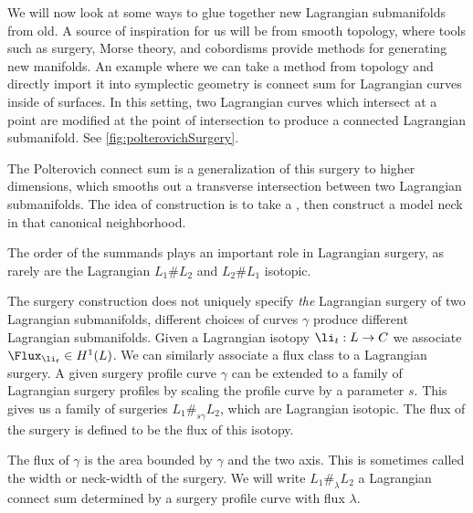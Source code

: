 
We will now look at some ways to glue together new Lagrangian submanifolds from old.
A source of inspiration for us will be from smooth topology, where tools such as surgery, Morse theory, and cobordisms provide methods for generating new manifolds.
An example where we can take a method from topology and directly import it into symplectic geometry is connect sum for Lagrangian curves inside of surfaces.
In this setting, two Lagrangian curves which intersect at a point are modified at the point of intersection to produce a connected Lagrangian submanifold.
See \cref{fig:polterovichSurgery}.

The Polterovich connect sum is a generalization of this surgery to higher dimensions, which smooths out a transverse intersection between two Lagrangian submanifolds. 
The idea of construction is to take a  , then construct a model neck in that canonical neighborhood. 



The order of the summands plays an important role in Lagrangian surgery, as rarely are the Lagrangian $L_1\#L_2$ and $L_2\#L_1$ isotopic. 

The surgery construction does not uniquely specify \emph{the} Lagrangian surgery of two Lagrangian submanifolds,  different choices of curves $\gamma$ produce different Lagrangian submanifolds.
Given a Lagrangian isotopy $\li_t: L\to C$ we associate  $\Flux_{\li_t}\in H^1(L)$. 
We can similarly associate a flux class to a Lagrangian surgery.
A given surgery profile curve $\gamma$ can be extended to a family of Lagrangian surgery profiles by scaling the profile curve by a parameter $s$.  
This gives us a family of surgeries $L_1\#_{s\gamma} L_2$, which are Lagrangian isotopic.
The flux of the surgery is defined to be the flux of this isotopy. 

The flux of $\gamma$ is the area bounded by $\gamma$ and the two axis. This is sometimes called the width or neck-width of the surgery.
We will write $L_1\#_{\lambda}L_2$ a Lagrangian connect sum determined by a surgery profile curve with flux $\lambda$.



